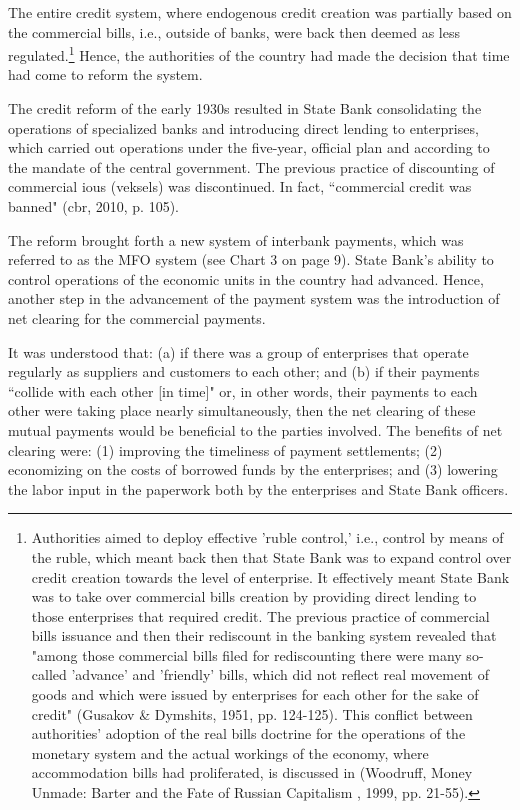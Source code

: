 The entire credit system, where endogenous credit creation was partially based on the commercial bills, i.e., outside of banks, were back then deemed as less regulated.\footnote{Authorities aimed to deploy effective 'ruble control,' i.e., control by means of the ruble, which meant back then that State Bank was to expand control over credit creation towards the level of enterprise. It effectively meant State Bank was to take over commercial bills creation by providing direct lending to those enterprises that required credit. The previous practice of commercial bills issuance and then their rediscount in the banking system revealed that "among those commercial bills filed for rediscounting there were many so-called 'advance' and 'friendly' bills, which did not reflect real movement of goods and which were issued by enterprises for each other for the sake of credit" (Gusakov \& Dymshits, 1951, pp. 124-125). This conflict between authorities' adoption of the real bills doctrine for the operations of the monetary system and the actual workings of the economy, where accommodation bills had proliferated, is discussed in (Woodruff, Money Unmade: Barter and the Fate of Russian Capitalism , 1999, pp. 21-55).} Hence, the authorities of the country had made the decision that time had come to reform the system.

The credit reform of the early 1930s resulted in State Bank consolidating the operations of specialized banks and introducing direct lending to enterprises, which carried out operations under the five-year, official plan and according to the mandate of the central government. The prev\acp{iou} practice of discounting of commercial \acp{iou} (veksels) was discontinued. In fact, ``commercial credit was banned" (\ac{cbr}, 2010, p. 105). 

The reform brought forth a new system of interbank payments, which was referred to as the MFO system (see Chart 3 on page 9). State Bank's ability to control operations of the economic units in the country had advanced. Hence, another step in the advancement of the payment system was the introduction of net clearing for the commercial payments. 

It was understood that: (a) if there was a group of enterprises that operate regularly as suppliers and customers to each other; and (b) if their payments ``collide with each other [in time]" or, in other words, their payments to each other were taking place nearly simultaneously, then the net clearing of these mutual payments would be beneficial to the parties involved. The benefits of net clearing were: (1) improving the timeliness of payment settlements; (2) economizing on the costs of borrowed funds by the enterprises; and (3) lowering the labor input in the paperwork both by the enterprises and State Bank officers. 

